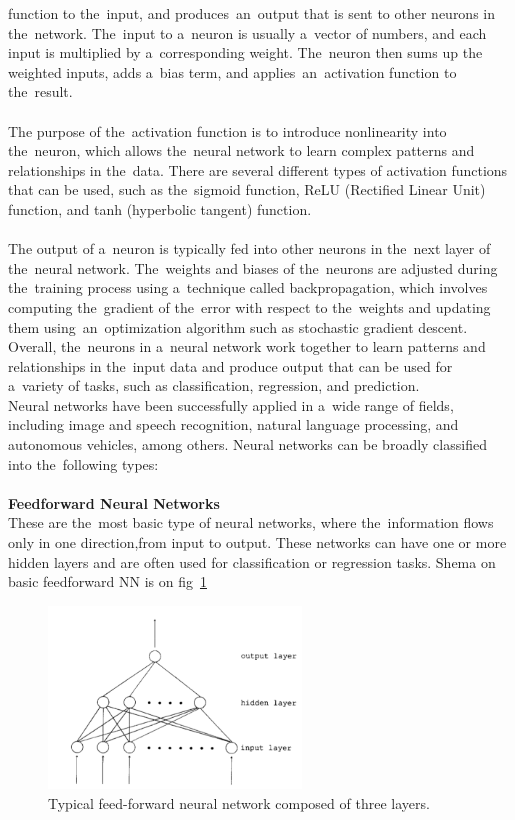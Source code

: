 function to the~input, and produces~an~output that is sent to other neurons in the~network. The~input to a~neuron is
usually a~vector of numbers, and each input is multiplied by a~corresponding weight. The~neuron then sums up the
weighted inputs, adds a~bias term, and applies~an~activation function to the~result.\\
\\
The purpose of the~activation function is to introduce nonlinearity into the~neuron, which allows the~neural network
to learn complex patterns and relationships in the~data. There are several different types of activation functions
that can be used, such as the~sigmoid function, ReLU (Rectified Linear Unit) function, and tanh (hyperbolic tangent)
function.\\
\\
The output of a~neuron is typically fed into other neurons in the~next layer of the~neural network. The~weights and
biases of the~neurons are adjusted during the~training process using a~technique called backpropagation, which involves
computing the~gradient of the~error with respect to the~weights and updating them using~an~optimization algorithm such
as stochastic gradient descent.\\
Overall, the~neurons in a~neural network work together to learn patterns and relationships in the~input data and produce
output that can be used for a~variety of tasks, such as classification, regression, and prediction.\\
Neural networks have been successfully applied in a~wide range of fields, including image and speech recognition, natural language processing, and autonomous vehicles, among others.
Neural networks can be broadly classified into the~following types:\\
\\
\textbf{Feedforward Neural Networks}\\
These are the~most basic type of neural networks, where the~information flows
only in one direction,from input to output. These networks can have one or more hidden layers and are often used for classification or regression tasks. Shema on basic feedforward NN is on fig~\ref{fig:ff}
    \begin{center}
        \begin{figure}[!ht]
            \centering
            \includegraphics[width=0.6\textwidth]{figures/ff}
            \caption{Typical feed-forward neural network composed of three layers. \cite{svozil1997quantum}}
            \label{fig:ff}
        \end{figure}
    \end{center}
